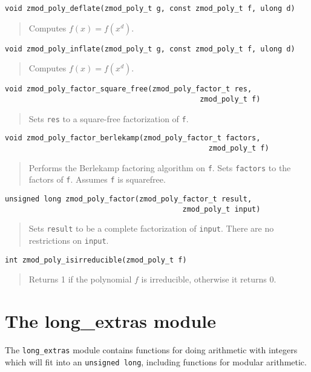 \documentclass[a4paper,10pt]{article}
\newcommand{\code}{\lstinline}
\begin{document}
\begin{lstlisting}
void zmod_poly_deflate(zmod_poly_t g, const zmod_poly_t f, ulong d)
\end{lstlisting}
\begin{quote}
Computes $f(x) = f(x^d)$.
\end{quote}

\begin{lstlisting}
void zmod_poly_inflate(zmod_poly_t g, const zmod_poly_t f, ulong d)
\end{lstlisting}
\begin{quote}
Computes $f(x) = f(x^d)$.
\end{quote}

\begin{lstlisting}
void zmod_poly_factor_square_free(zmod_poly_factor_t res,
                                             zmod_poly_t f)
\end{lstlisting}
\begin{quote}
Sets \code{res} to a square-free factorization of \code{f}.
\end{quote}

\begin{lstlisting}
void zmod_poly_factor_berlekamp(zmod_poly_factor_t factors,
                                               zmod_poly_t f)
\end{lstlisting}
\begin{quote}
Performs the Berlekamp factoring algorithm on \code{f}.  Sets \code{factors} to the factors of \code{f}.  Assumes \code{f} is squarefree.  
\end{quote}

\begin{lstlisting}
unsigned long zmod_poly_factor(zmod_poly_factor_t result,
                                         zmod_poly_t input)
\end{lstlisting}
\begin{quote}
Sets \code{result} to be a complete factorization of \code{input}.  There are no restrictions on \code{input}.
\end{quote}

\begin{lstlisting}
int zmod_poly_isirreducible(zmod_poly_t f) 
\end{lstlisting}
\begin{quote}
Returns 1 if the polynomial $f$ is irreducible, otherwise it returns 0.
\end{quote}

\section{The long\_extras module}
The \code{long_extras} module contains functions for doing arithmetic with integers which will fit into an \code{unsigned long}, including functions for modular arithmetic.
\end{document}
